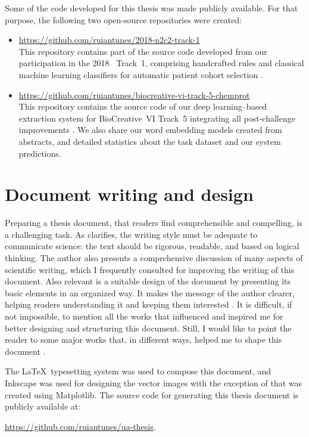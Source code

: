 Some of the code developed for this thesis was made publicly available.
For that purpose, the following two open-source repositories were created:

\begin{itemize}

\item
\url{https://github.com/ruiantunes/2018-n2c2-track-1}\\
This repository contains part of the source code developed from our participation in the 2018~ Track~1, comprising handcrafted rules and classical machine learning classifiers for automatic patient cohort selection \parencite{antunes2019a}.

\item
\url{https://github.com/ruiantunes/biocreative-vi-track-5-chemprot}\\
This repository contains the source code of our deep learning--based  extraction system for BioCreative~VI Track~5 integrating all post-challenge improvements \parencite{antunes2019b}.
We also share our word embedding models created from  abstracts, and detailed statistics about the task dataset and our system predictions.

\end{itemize}


\section{Document writing and design}

Preparing a thesis document, that readers find comprehensible and compelling, is a challenging task.
As \textcite{zobel2014a} clarifies, the writing style must be adequate to communicate science: the text should be rigorous, readable, and based on logical thinking.
The author also presents a comprehensive discussion of many aspects of scientific writing, which I frequently consulted for improving the writing of this document.
Also relevant is a suitable design of the document by presenting its basic elements in an organized way. It makes the message of the author clearer, helping readers understanding it and keeping them interested \parencite{schriver1990a,telg2021a}.
It is difficult, if not impossible, to mention all the works that influenced and inspired me for better designing and structuring this document.
Still, I would like to point the reader to some major works that, in different ways, helped me to shape this document \parencite{oliveiraesilva1994a,campos2013a,gal2016a,baker2017a,amos2019a,oleynik2020a}.

The \LaTeX\ typesetting system was used to compose this document, and Inkscape was used for designing the vector images with the exception of  that was created using Matplotlib.
The source code for generating this thesis document is publicly available at:

\centerline{\url{https://github.com/ruiantunes/ua-thesis}.}
